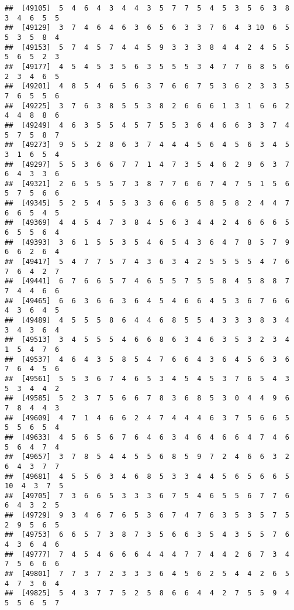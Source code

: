 \documentclass[
]{book}
\begin{document}
\begin{verbatim}
##  [49105]  5  4  6  4  3  4  4  3  5  7  7  5  4  5  3  5  6  3  8  3  4  6  5  5
##  [49129]  3  7  4  6  4  6  3  6  5  6  3  3  7  6  4  3 10  6  5  5  3  5  8  4
##  [49153]  5  7  4  5  7  4  4  5  9  3  3  3  8  4  4  2  4  5  5  5  6  5  2  3
##  [49177]  4  5  4  5  3  5  6  3  5  5  5  3  4  7  7  6  8  5  6  2  3  4  6  5
##  [49201]  4  8  5  4  6  5  6  3  7  6  6  7  5  3  6  2  3  3  5  7  6  5  5  6
##  [49225]  3  7  6  3  8  5  5  3  8  2  6  6  6  1  3  1  6  6  2  4  4  8  8  6
##  [49249]  4  6  3  5  5  4  5  7  5  5  3  6  4  6  6  3  3  7  4  5  7  5  8  7
##  [49273]  9  5  5  2  8  6  3  7  4  4  4  5  6  4  5  6  3  4  5  3  1  6  5  4
##  [49297]  5  5  3  6  6  7  7  1  4  7  3  5  4  6  2  9  6  3  7  6  4  3  3  6
##  [49321]  2  6  5  5  5  7  3  8  7  7  6  6  7  4  7  5  1  5  6  5  7  5  6  6
##  [49345]  5  2  5  4  5  5  3  3  6  6  6  5  8  5  8  2  4  4  7  6  6  5  4  5
##  [49369]  4  4  5  4  7  3  8  4  5  6  3  4  4  2  4  6  6  6  5  6  5  5  6  4
##  [49393]  3  6  1  5  5  3  5  4  6  5  4  3  6  4  7  8  5  7  9  6  6  2  6  4
##  [49417]  5  4  7  7  5  7  4  3  6  3  4  2  5  5  5  5  4  7  6  7  6  4  2  7
##  [49441]  6  7  6  6  5  7  4  6  5  5  7  5  5  8  4  5  8  8  7  7  4  4  6  6
##  [49465]  6  6  3  6  6  3  6  4  5  4  6  6  4  5  3  6  7  6  6  4  3  6  4  5
##  [49489]  4  5  5  5  8  6  4  4  6  8  5  5  4  3  3  3  8  3  4  3  4  3  6  4
##  [49513]  3  4  5  5  5  4  6  6  8  6  3  4  6  3  5  3  2  3  4  1  5  4  7  6
##  [49537]  4  6  4  3  5  8  5  4  7  6  6  4  3  6  4  5  6  3  6  7  6  4  5  6
##  [49561]  5  5  3  6  7  4  6  5  3  4  5  4  5  3  7  6  5  4  3  5  3  4  4  2
##  [49585]  5  2  3  7  5  6  6  7  8  3  6  8  5  3  0  4  4  9  6  7  8  4  4  3
##  [49609]  4  7  1  4  6  6  2  4  7  4  4  4  6  3  7  5  6  6  5  5  5  6  5  4
##  [49633]  4  5  6  5  6  7  6  4  6  3  4  6  4  6  6  4  7  4  6  5  6  4  7  4
##  [49657]  3  7  8  5  4  4  5  5  6  8  5  9  7  2  4  6  6  3  2  6  4  3  7  7
##  [49681]  4  5  5  6  3  4  6  8  5  3  3  4  4  5  6  5  6  6  5 10  4  3  7  5
##  [49705]  7  3  6  6  5  3  3  3  6  7  5  4  6  5  5  6  7  7  6  6  4  3  2  5
##  [49729]  9  3  4  6  7  6  5  3  6  7  4  7  6  3  5  3  5  7  5  2  9  5  6  5
##  [49753]  6  6  5  7  3  8  7  3  5  6  6  3  5  4  3  5  5  7  6  4  3  6  4  6
##  [49777]  7  4  5  4  6  6  6  4  4  4  7  7  4  4  2  6  7  3  4  7  5  6  6  6
##  [49801]  7  7  3  7  2  3  3  3  6  4  5  6  2  5  4  4  2  6  5  4  7  3  6  4
##  [49825]  5  4  3  7  7  5  2  5  8  6  6  4  4  2  7  5  5  9  4  5  5  6  5  7

\end{verbatim}
\end{document}
